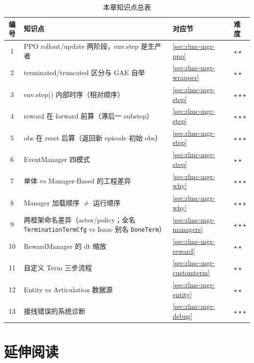 \begin{table}[H]
\centering
\caption{本章知识点总表}
\label{tab:rlmc-mgr-knowledge}
\footnotesize
\begin{tabular}{@{}clll@{}}
\toprule
编号 & 知识点 & 对应节 & 难度 \\
\midrule
1 & PPO rollout/update 两阶段，env.step 是生产者 & \cref{sec:rlmc-mgr-ppo} & $\star\star$ \\
2 & terminated/truncated 区分与 GAE 自举 & \cref{sec:rlmc-mgr-wrapper} & $\star\star$ \\
3 & env.step() 内部时序（相对顺序） & \cref{sec:rlmc-mgr-step} & $\star\star\star$ \\
4 & reward 在 forward 前算（滞后一 substep） & \cref{sec:rlmc-mgr-step} & $\star\star\star$ \\
5 & obs 在 reset 后算（返回新 episode 初始 obs） & \cref{sec:rlmc-mgr-step} & $\star\star\star$ \\
6 & EventManager 四模式 & \cref{sec:rlmc-mgr-step} & $\star\star$ \\
7 & 单体 vs Manager-Based 的工程差异 & \cref{sec:rlmc-mgr-why} & $\star\star\star$ \\
8 & Manager 加载顺序 $\ne$ 运行顺序 & \cref{sec:rlmc-mgr-why} & $\star\star\star$ \\
9 & 两框架命名差异（actor/policy；全名 \texttt{TerminationTermCfg} vs Isaac 别名 \texttt{DoneTerm}） & \cref{sec:rlmc-mgr-managers} & $\star\star\star$ \\
10 & RewardManager 的 dt 缩放 & \cref{sec:rlmc-mgr-reward} & $\star\star$ \\
11 & 自定义 Term 三步流程 & \cref{sec:rlmc-mgr-customterm} & $\star\star$ \\
12 & Entity vs Articulation 数据源 & \cref{sec:rlmc-mgr-entity} & $\star\star$ \\
13 & 接线错误的系统诊断 & \cref{sec:rlmc-mgr-debug} & $\star\star\star$ \\
\bottomrule
\end{tabular}
\end{table}

\section*{延伸阅读}
\label{sec:rlmc-mgr-further}


